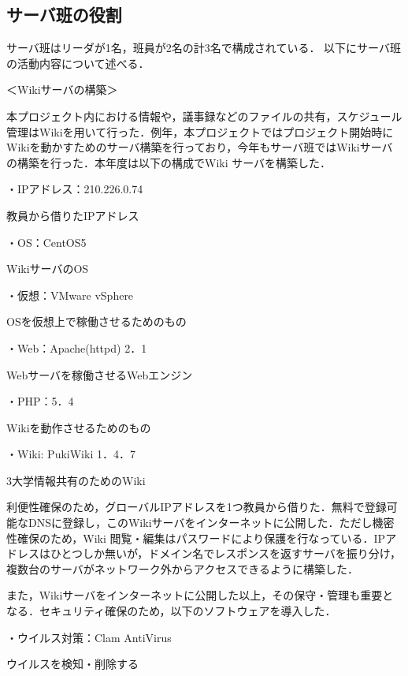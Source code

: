 \subsection{サーバ班の役割}
\par サーバ班はリーダが1名，班員が2名の計3名で構成されている．
以下にサーバ班の活動内容について述べる．
\par ＜Wikiサーバの構築＞
\par
本プロジェクト内における情報や，議事録などのファイルの共有，スケジュール管理はWikiを用いて行った．例年，本プロジェクトではプロジェクト開始時にWikiを動かすためのサーバ構築を行っており，今年もサーバ班ではWikiサーバの構築を行った．本年度は以下の構成でWiki サーバを構築した．
\par
\par ・IPアドレス：210.226.0.74
\par 教員から借りたIPアドレス
\par
\par ・OS：CentOS5
\par WikiサーバのOS
\par 
\par ・仮想：VMware vSphere
\par OSを仮想上で稼働させるためのもの
\par 
\par ・Web：Apache(httpd) 2．1
\par Webサーバを稼働させるWebエンジン
\par 
\par ・PHP：5．4
\par Wikiを動作させるためのもの
\par 
\par ・Wiki: PukiWiki 1．4．7
\par 3大学情報共有のためのWiki
\par
\par
利便性確保のため，グローバルIPアドレスを1つ教員から借りた．無料で登録可能なDNSに登録し，このWikiサーバをインターネットに公開した．ただし機密性確保のため，Wiki 閲覧・編集はパスワードにより保護を行なっている．IPアドレスはひとつしか無いが，ドメイン名でレスポンスを返すサーバを振り分け，複数台のサーバがネットワーク外からアクセスできるように構築した．
\par
また，Wikiサーバをインターネットに公開した以上，その保守・管理も重要となる．セキュリティ確保のため，以下のソフトウェアを導入した．
\par
\par ・ウイルス対策：Clam AntiVirus
\par ウイルスを検知・削除する
